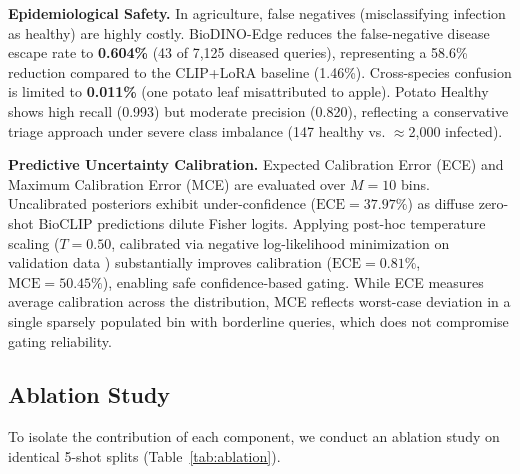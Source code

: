 \documentclass[conference]{IEEEtran}
\begin{document}
\textbf{Epidemiological Safety.} In agriculture, false negatives (misclassifying infection as healthy) are highly costly. BioDINO-Edge reduces the false-negative disease escape rate to \textbf{0.604\%} (43 of 7,125 diseased queries), representing a 58.6\% reduction compared to the CLIP+LoRA baseline (1.46\%). Cross-species confusion is limited to \textbf{0.011\%} (one potato leaf misattributed to apple). Potato Healthy shows high recall (0.993) but moderate precision (0.820), reflecting a conservative triage approach under severe class imbalance (147 healthy vs. $\approx$2,000 infected).

\textbf{Predictive Uncertainty Calibration.} Expected Calibration Error (ECE) and Maximum Calibration Error (MCE) are evaluated over $M=10$ bins. Uncalibrated posteriors exhibit under-confidence ($\text{ECE} = 37.97\%$) as diffuse zero-shot BioCLIP predictions dilute Fisher logits. Applying post-hoc temperature scaling ($T=0.50$, calibrated via negative log-likelihood minimization on validation data \cite{guo2017calibration}) substantially improves calibration ($\text{ECE} = \mathbf{0.81\%}$, $\text{MCE} = 50.45\%$), enabling safe confidence-based gating. While ECE measures average calibration across the distribution, MCE reflects worst-case deviation in a single sparsely populated bin with borderline queries, which does not compromise gating reliability.

\subsection{Ablation Study}
\label{sec:ablation_study}
To isolate the contribution of each component, we conduct an ablation study on identical 5-shot splits (Table~\ref{tab:ablation}).

{\renewcommand{\arraystretch}{0.92}
\begin{table}[htbp]
\caption{Systematic Component Ablation Study (5-Shot, 9,330 Queries)}
\label{tab:ablation}
\centering
{}
\end{table}
}
\end{document}
